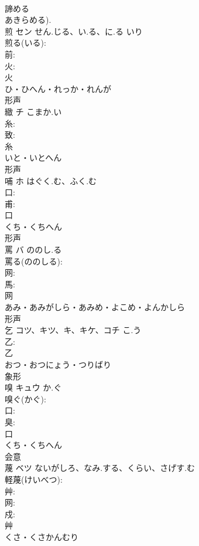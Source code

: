 \documentclass[8pt]{extreport}
\begin{document}
\begin{CJK}{UTF8}{min}
\\	諦める 
\\	あきらめる).
\\	煎	セン	せん.じる、い.る、に.る	いり	
\\	煎る(いる): 
\\	前: 
\\	火: 
\\	火	
\\	ひ・ひへん・れっか・れんが	
\\	形声 
\\	緻	チ	こまか.い		
\\	糸: 
\\	致: 
\\	糸	
\\	いと・いとへん	
\\	形声 
\\	哺	ホ	はぐく.む、ふく.む		
\\	口: 
\\	甫: 
\\	口	
\\	くち・くちへん	
\\	形声 
\\	罵	バ	ののし.る		
\\	罵る(ののしる): 
\\	网: 
\\	馬: 
\\	网	
\\	あみ・あみがしら・あみめ・よこめ・よんかしら	
\\	形声 
\\	乞	コツ、キツ、キ、キケ、コチ	こ.う		
\\	乙: 
\\	乙	
\\	おつ・おつにょう・つりばり	
\\	象形 
\\	嗅	キュウ	か.ぐ		
\\	嗅ぐ(かぐ): 
\\	口: 
\\	臭: 
\\	口	
\\	くち・くちへん	
\\	会意 
\\	蔑	ベツ	ないがしろ、なみ.する、くらい、さげす.む		
\\	軽蔑(けいべつ): 
\\	艸: 
\\	网: 
\\	戍: 
\\	艸	
\\	くさ・くさかんむり	

\end{CJK}
\end{document}
